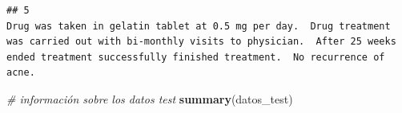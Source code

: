 \documentclass[spanish,]{article}
\newenvironment{Shaded}{\begin{snugshade}}{\end{snugshade}}
\newcommand{\KeywordTok}[1]{\textcolor[rgb]{0.13,0.29,0.53}{\textbf{#1}}}
\newcommand{\CommentTok}[1]{\textcolor[rgb]{0.56,0.35,0.01}{\textit{#1}}}
\newcommand{\NormalTok}[1]{#1}
\begin{document}
\begin{verbatim}
## 5                                                                                                                                                                                                                                                                                                                                                                                                                                                                                                                                                                                                                                                                                                                                                                                                                                                                                                                                                                                                                                 Drug was taken in gelatin tablet at 0.5 mg per day.  Drug treatment was carried out with bi-monthly visits to physician.  After 25 weeks ended treatment successfully finished treatment.  No recurrence of acne.
\end{verbatim}

\begin{Shaded}
\begin{Highlighting}[]
\CommentTok{# información sobre los datos test}
\KeywordTok{summary}\NormalTok{(datos_test) }
\end{Highlighting}
\end{Shaded}
\end{document}
